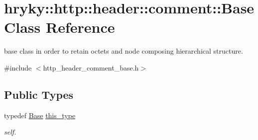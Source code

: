 \hypertarget{classhryky_1_1http_1_1header_1_1comment_1_1_base}{\section{hryky\-:\-:http\-:\-:header\-:\-:comment\-:\-:Base Class Reference}
\label{classhryky_1_1http_1_1header_1_1comment_1_1_base}
}


base class in order to retain octets and node composing hierarchical structure.  




{\ttfamily \#include $<$http\-\_\-header\-\_\-comment\-\_\-base.\-h$>$}

\subsection*{Public Types}
\begin{DoxyCompactItemize}
\item 
\hypertarget{classhryky_1_1http_1_1header_1_1comment_1_1_base_aaf640b42927f7c8c53ee91e0e13422ca}{typedef \hyperlink{classhryky_1_1http_1_1header_1_1comment_1_1_base}{Base} \hyperlink{classhryky_1_1http_1_1header_1_1comment_1_1_base_aaf640b42927f7c8c53ee91e0e13422ca}{this\-\_\-type}}\label{classhryky_1_1http_1_1header_1_1comment_1_1_base_aaf640b42927f7c8c53ee91e0e13422ca}

\begin{DoxyCompactList}\small\item\em self. \end{DoxyCompactList}\end{DoxyCompactItemize}

